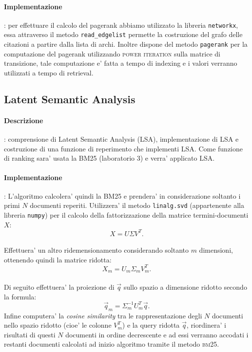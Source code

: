 \paragraph{\textbf{Implementazione}}: per effettuare il calcolo del pagerank abbiamo utilizzato la libreria \texttt{networkx}, essa attraverso il metodo \texttt{read\_edgelist} permette la costruzione del grafo delle citazioni a partire dalla lista di archi. Inoltre dispone del metodo \texttt{pagerank} per la computazione del pagerank utilizzando \textsc{power iteration} sulla matrice di transizione, tale computazione e' fatta a tempo di indexing e i valori verranno utilizzati a tempo di retrieval.

\subsection{Latent Semantic Analysis}
\label{sec:lsa}

\paragraph{\textbf{Descrizione}}: comprensione di Latent Semantic Analysis (\textsc{LSA}), implementazione di LSA e costruzione di una funzione di reperimento che implementi LSA.
Come funzione di ranking sara' usata la BM25 (laboratorio 3) e verra' applicato LSA. 


\paragraph{\textbf{Implementazione}}: 
L'algoritmo calcolera' quindi la BM25 e prendera' in considerazione soltanto i primi $N$ documenti reperiti. Utilizzera' il metodo \texttt{linalg.svd} (appartenente alla libreria \texttt{numpy}) per il calcolo della fattorizzazione della matrice termini-documenti $X$: 
\[ X = U \Sigma V^{T}. \]\\
Effettuera' un altro ridemensionamento considerando soltanto $m$ dimensioni, ottenendo quindi la matrice ridotta: \[ X_m = U_m \Sigma_m V^{T}_m. \]\\
Di seguito effettuera' la proiezione di $\vec{q}$ sullo spazio a dimensione ridotto secondo la formula: 
\[ \vec{q}_m = \Sigma^{-1}_m U^{T}_m \vec{q}. \]
Infine computera' la \textit{cosine similarity} tra le rappresentazione degli $N$ documenti nello spazio ridotto (cioe' le colonne $V^{T}_m$) e la query ridotta $\vec{q}$, riordinera' i risultati di questi $N$ documenti in ordine decrescente e ad essi verranno accodati i restanti documenti calcolati ad inizio algoritmo tramite il metodo \textsc{bm25}.


